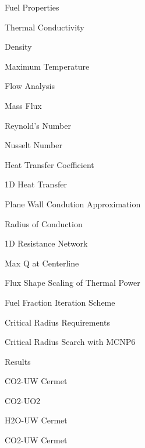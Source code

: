 \documentclass{report}
\begin{document}
\begin{outline}
\begin{outline}
\begin{outline}
\begin{outline}
              \end{outline}
          \item { Fuel Properties }
              \begin{outline}
              \item { Thermal Conductivity }
              \item { Density }
              \item { Maximum Temperature }
              \end{outline}
          \item { Flow Analysis}
              \begin{outline}
              \item { Mass Flux }
              \item { Reynold's Number }
              \item { Nusselt Number }
              \item { Heat Transfer Coefficient }
              \end{outline}
          \item { 1D Heat Transfer }
              \begin{outline}
              \item { Plane Wall Condution Approximation }
              \item { Radius of Conduction }
              \item { 1D Resistance Network }
              \item { Max Q at Centerline }
              \item { Flux Shape Scaling of Thermal Power}
              \end{outline}
          \item { Fuel Fraction Iteration Scheme }
          \end{outline}
      \item { Critical Radius Requirements }
          \begin{outline}
          \item { Critical Radius Search with MCNP6}
          \item { Results }
              \begin{outline}
              \item {CO2-UW Cermet}
              \item {CO2-UO2}
              \item {H2O-UW Cermet}
              \item {CO2-UW Cermet}
              \end{outline}

\end{outline}
\end{outline}
\end{outline}
\end{document}

